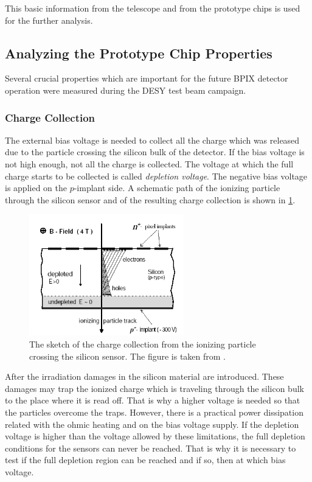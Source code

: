 This basic information from the telescope and from the prototype chips is used for the further analysis.

\subsection{Analyzing the Prototype Chip Properties}

Several crucial properties which are important for the future BPIX detector operation were measured during the DESY test beam 
campaign.

\subsubsection{Charge Collection}

The external bias voltage is needed to collect all the charge which was released due to the particle crossing the silicon bulk
of the detector. If the bias voltage is not high enough, not all the charge is collected. The voltage at which the full charge starts 
to be collected is called \textit{depletion voltage}. The negative bias voltage is applied on the $p$-implant side. A schematic path 
of the ionizing particle through the silicon sensor and of the resulting charge collection is shown in \ref{fig:depl_volt}.

\begin{figure}[h]
 \centering
 \includegraphics[width=0.6\textwidth]{021_pixel_upgrade/plots/depletion_voltage.png}
 \caption{The sketch of the charge collection from the ionizing particle crossing the silicon sensor. The figure is taken from \cite{DanielTalk}.}
 \label{fig:depl_volt}
\end{figure}

After the irradiation damages in the silicon material are introduced. These damages may trap the ionized charge  which is traveling 
through the silicon bulk to the place where it is read off. That is why a higher voltage is needed so that the particles overcome the traps.
However, there is a practical power dissipation related with the ohmic heating and on the bias voltage supply. If the depletion voltage
is higher than the voltage allowed by these limitations, the full depletion conditions for the sensors can never be reached. That is why 
it is necessary to test if the full depletion region can be reached and if so, then at which bias voltage.

